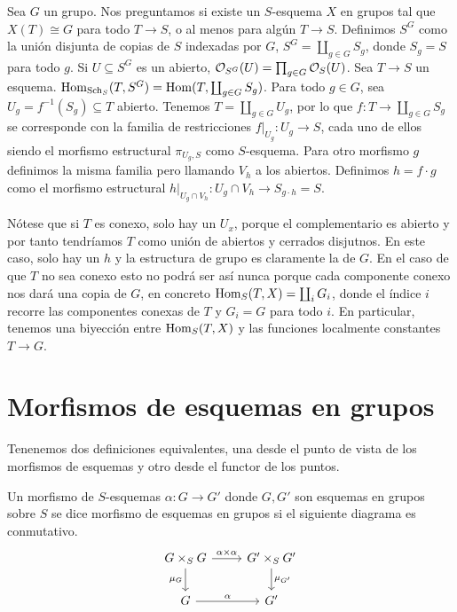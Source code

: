 \documentclass[GA.tex]{subfiles}
\begin{document}
\begin{ej}
Sea $G$ un grupo. Nos preguntamos si existe un $S$-esquema $X$ en grupos tal que $X(T)\cong G$ para todo $T\to S$, o al menos para algún $T\to S$. Definimos $S^G$ como la unión disjunta de copias de $S$ indexadas por $G$, $S^G=\coprod_{g\in G}S_g$, donde $S_g=S$ para todo $g$. Si $U\subseteq S^G$ es un abierto, ${\mathcal O}_{S^G}(U)=\prod_{g\in G}{\mathcal O}_S(U)$. Sea $T\to S$ un esquema. $\operatorname{Hom}_{\operatorname{Sch}_S}(T,S^G)=\operatorname{Hom}(T,\coprod_{g\in G}S_g)$. Para todo $g\in G$, sea $U_g=f^{-1}(S_g)\subseteq T$ abierto. Tenemos $T=\coprod_{g\in G} U_g$, por lo que $f:T\to\coprod_{g\in G}S_g$ se corresponde con la familia de restricciones $f|_{U_g}:U_g\to S$, cada uno de ellos siendo el morfismo estructural $\pi_{U_g,S}$ como $S$-esquema. Para otro morfismo $g$ definimos la misma familia pero llamando $V_h$ a los abiertos. Definimos $h=f\cdot g$ como el morfismo estructural $h|_{U_g\cap V_h}:U_g\cap V_h\to S_{g\cdot h}=S$.

Nótese que si $T$ es conexo, solo hay un $U_x$, porque el complementario es abierto y por tanto tendríamos $T$ como unión de abiertos y cerrados disjutnos. En este caso, solo hay un $h$ y la estructura de grupo es claramente la de $G$. En el caso de que $T$ no sea conexo esto no podrá ser así nunca porque cada componente conexo nos dará una copia de $G$, en concreto $\operatorname{Hom}_S(T,X)=\coprod_i G_i$, donde el índice $i$ recorre las componentes conexas de $T$ y $G_i=G$ para todo $i$. En particular, tenemos una biyección entre $\operatorname{Hom}_S(T,X)$ y las funciones localmente constantes $T\to G$. 
\end{ej}

\section{Morfismos de esquemas en grupos}
Tenenemos dos definiciones equivalentes, una desde el punto de vista de los morfismos de esquemas y otro desde el functor de los puntos. 

\begin{defi}
Un morfismo de $S$-esquemas $\alpha:G\to G'$ donde $G,G'$ son esquemas en grupos sobre $S$ se dice morfismo de esquemas en grupos si el siguiente diagrama es conmutativo.
\[
\begin{tikzcd}
G\times_S G \arrow[r, "\alpha\times\alpha"] \arrow[d, "\mu_G"'] & G'\times_S G' \arrow[d, "\mu_{G'}"] \\
G \arrow[r, "\alpha"] & G'
\end{tikzcd}
\]
\end{defi}
\end{document}
